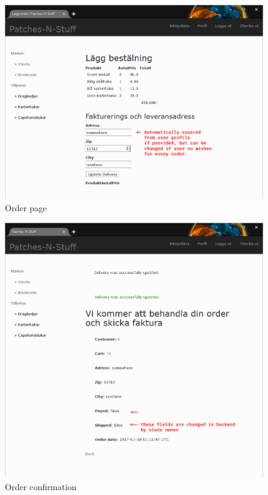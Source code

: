 \documentclass[paper=a4, fontsize=11pt]{report} %
\begin{document}
\begin{itemize}
\begin{figure}
	\includegraphics[width=0.9\paperwidth]{artifacts/stories/10_order.png}
	\caption{Order page}
	\label{fig:order}
\end{figure}

\begin{figure}
	\includegraphics[width=0.9\paperwidth]{artifacts/stories/11_order_confirmation.png}
	\caption{Order confirmation}
	\label{fig:order_confirmation}
\end{figure}


\end{itemize}
\end{document}
